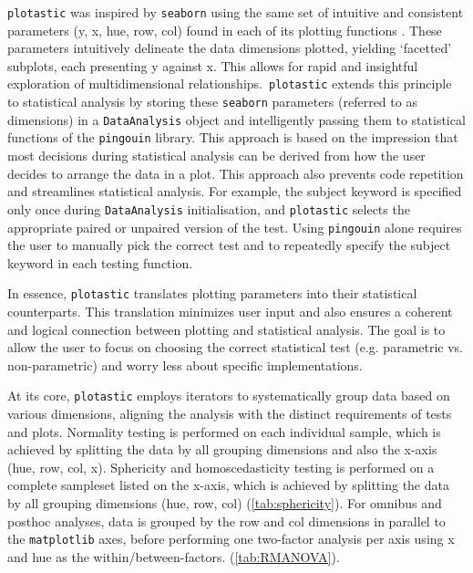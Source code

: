 \texttt{plotastic} was inspired by \texttt{seaborn} using the same set of intuitive
and consistent parameters (y, x, hue, row, col) found in each of its
plotting functions \cite{waskomSeabornStatisticalData2021}. These parameters
intuitively delineate the data dimensions plotted, yielding `facetted'
subplots, each presenting y against x. This allows for rapid and
insightful exploration of multidimensional relationships.~\texttt{plotastic}
extends this principle to statistical analysis by storing these
\texttt{seaborn} parameters (referred to as dimensions) in a \texttt{DataAnalysis}
object and intelligently passing them to statistical functions of the
\texttt{pingouin} library. This approach is based on the impression that most
decisions during statistical analysis can be derived from how the user
decides to arrange the data in a plot. This approach also prevents code
repetition and streamlines statistical analysis. For example, the
subject keyword is specified only once during \texttt{DataAnalysis}
initialisation, and \texttt{plotastic} selects the appropriate paired or
unpaired version of the test. Using \texttt{pingouin} alone requires the user
to manually pick the correct test and to repeatedly specify the subject
keyword in each testing function.

In essence, \texttt{plotastic} translates plotting parameters into their
statistical counterparts. This translation minimizes user input and also
ensures a coherent and logical connection between plotting and
statistical analysis. The goal is to allow the user to focus on choosing
the correct statistical test (e.g. parametric vs. non-parametric) and
worry less about specific implementations.

At its core, \texttt{plotastic} employs iterators to systematically group data
based on various dimensions, aligning the analysis with the distinct
requirements of tests and plots. Normality testing is performed on each
individual sample, which is achieved by splitting the data by all
grouping dimensions and also the x-axis (hue, row, col, x). Sphericity
and homoscedasticity testing is performed on a complete sampleset listed
on the x-axis, which is achieved by splitting the data by all grouping
dimensions (hue, row, col)  (\autoref{tab:sphericity}). For omnibus and
posthoc analyses, data is grouped by the row and col dimensions in
parallel to the \texttt{matplotlib} axes, before performing one two-factor
analysis per axis using x and hue as the within/between-factors.
(\autoref{tab:RMANOVA}).

